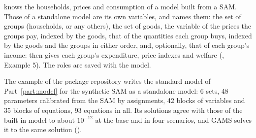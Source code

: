 
 knows the households, prices and consumption of a model
built from a SAM. Those of a standalone model are its own variables, and
 names them: the set of groups (households, or any
others), the set of goods, the variable of the prices the groups pay,
indexed by the goods, that of the quantities each group buys, indexed by the
goods and the groups in either order, and, optionally, that of each group's
income:
 then gives each group's expenditure, price indexes and
welfare (, Example 5). The roles are saved with the model.


The example  of the package repository
writes the standard model of Part~\ref{part:model} for the synthetic SAM as a
standalone model: 6 sets, 48 parameters calibrated from the SAM by
assignments, 42 blocks of variables and 35 blocks of equations, 93 equations
in all. Its solutions agree with those of the built-in model to about
$10^{-12}$ at the base and in four scenarios, and GAMS solves it to the same
solution ().


